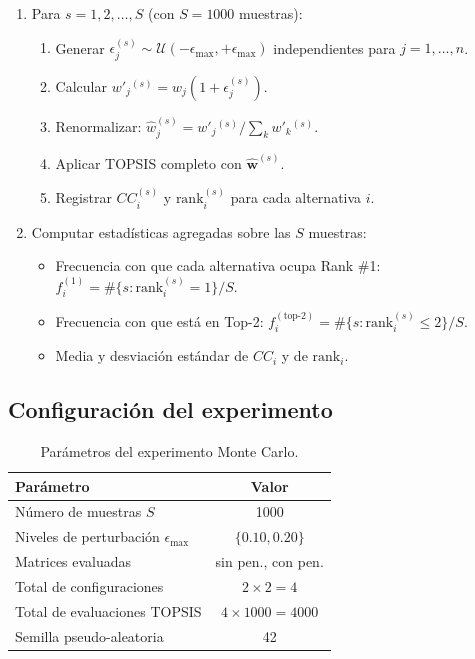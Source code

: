\documentclass[12pt,a4paper,oneside]{book}
\begin{document}
\begin{enumerate}[leftmargin=*]
    \item Para $s = 1, 2, \ldots, S$ (con $S = 1000$ muestras):
    \begin{enumerate}
        \item Generar $\epsilon_j^{(s)} \sim \mathcal{U}(-\epsilon_{\max}, +\epsilon_{\max})$ independientes para $j = 1, \ldots, n$.
        \item Calcular $w'_j{}^{(s)} = w_j (1 + \epsilon_j^{(s)})$.
        \item Renormalizar: $\hat{w}_j^{(s)} = w'_j{}^{(s)} / \sum_k w'_k{}^{(s)}$.
        \item Aplicar TOPSIS completo con $\hat{\mathbf{w}}^{(s)}$.
        \item Registrar $CC_i^{(s)}$ y $\text{rank}_i^{(s)}$ para cada alternativa $i$.
    \end{enumerate}
    \item Computar estadísticas agregadas sobre las $S$ muestras:
    \begin{itemize}
        \item Frecuencia con que cada alternativa ocupa Rank \#1: $f_i^{(1)} = \#\{s : \text{rank}_i^{(s)} = 1\}/S$.
        \item Frecuencia con que está en Top-2: $f_i^{(\text{top-2})} = \#\{s : \text{rank}_i^{(s)} \leq 2\}/S$.
        \item Media y desviación estándar de $CC_i$ y de $\text{rank}_i$.
    \end{itemize}
\end{enumerate}

\subsection{Configuración del experimento}

\begin{table}[H]
\centering
\caption{Parámetros del experimento Monte Carlo.}
\renewcommand{\arraystretch}{1.3}
\begin{tabular}{lc}
\toprule
\textbf{Parámetro} & \textbf{Valor} \\
\midrule
Número de muestras $S$ & 1000 \\
Niveles de perturbación $\epsilon_{\max}$ & $\{0.10, 0.20\}$ \\
Matrices evaluadas & sin pen., con pen. \\
Total de configuraciones & $2 \times 2 = 4$ \\
Total de evaluaciones TOPSIS & $4 \times 1000 = 4000$ \\
Semilla pseudo-aleatoria & 42 \\
\bottomrule
\end{tabular}
\end{table}
\end{document}
